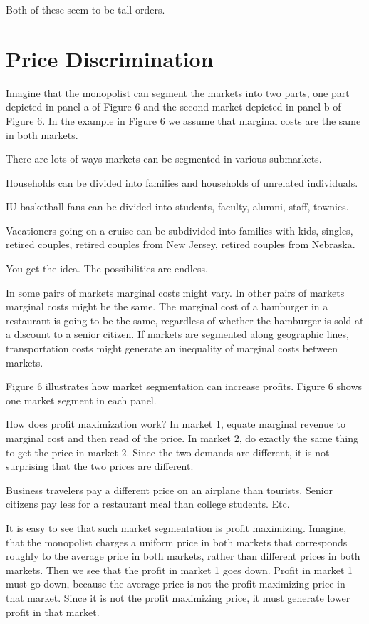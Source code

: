 \documentclass[
]{book}
\begin{document}
Both of these seem to be tall orders.

\hypertarget{price-discrimination}{%
\section{Price Discrimination}\label{price-discrimination}}

Imagine that the monopolist can segment the markets into two parts, one part depicted in panel a of Figure 6 and the second market depicted in panel b of Figure 6. In the example in Figure 6 we assume that marginal costs are the same in both markets.

There are lots of ways markets can be segmented in various submarkets.

Households can be divided into families and households of unrelated individuals.

IU basketball fans can be divided into students, faculty, alumni, staff, townies.

Vacationers going on a cruise can be subdivided into families with kids, singles, retired couples, retired couples from New Jersey, retired couples from Nebraska.

You get the idea. The possibilities are endless.

In some pairs of markets marginal costs might vary. In other pairs of markets marginal costs might be the same. The marginal cost of a hamburger in a restaurant is going to be the same, regardless of whether the hamburger is sold at a discount to a senior citizen. If markets are segmented along geographic lines, transportation costs might generate an inequality of marginal costs between markets.

Figure 6 illustrates how market segmentation can increase profits. Figure 6 shows one market segment in each panel.

How does profit maximization work? In market 1, equate marginal revenue to marginal cost and then read of the price. In market 2, do exactly the same thing to get the price in market 2. Since the two demands are different, it is not surprising that the two prices are different.

Business travelers pay a different price on an airplane than tourists.
Senior citizens pay less for a restaurant meal than college students.
Etc.

It is easy to see that such market segmentation is profit maximizing. Imagine, that the monopolist charges a uniform price in both markets that corresponds roughly to the average price in both markets, rather than different prices in both markets. Then we see that the profit in market 1 goes down. Profit in market 1 must go down, because the average price is not the profit maximizing price in that market. Since it is not the profit maximizing price, it must generate lower profit in that market.
\end{document}
